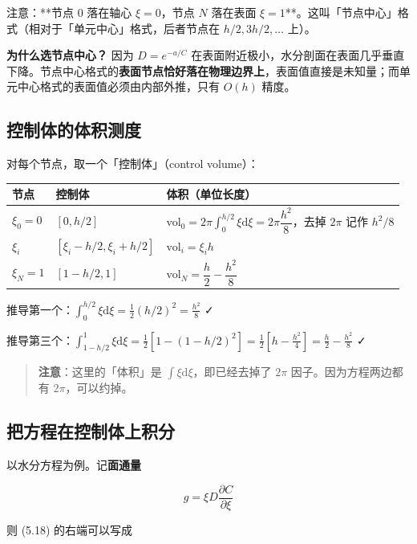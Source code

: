 注意：**节点 0 落在轴心 $\xi=0$，节点 $N$ 落在表面 $\xi=1$**。这叫「节点中心」格式（相对于「单元中心」格式，后者节点在 $h/2,3h/2,\dots$ 上）。


\textbf{为什么选节点中心？} 因为 $D=e^{-a/C}$ 在表面附近极小，水分剖面在表面几乎垂直下降。节点中心格式的\textbf{表面节点恰好落在物理边界上}，表面值直接是未知量；而单元中心格式的表面值必须由内部外推，只有 $O(h)$ 精度。


\subsection{控制体的体积测度}


对每个节点，取一个「控制体」（control volume）：


\begin{center}
\small
\begin{tabular}{lll}
\toprule
节点 & 控制体 & 体积（单位长度） \\
\midrule
$\xi_0=0$ & $[0,h/2]$ & $\mathrm{vol}_0=2\pi\int_0^{h/2}\xi\mathrm{d}\xi=2\pi\dfrac{h^2}{8}$，去掉 $2\pi$ 记作 $h^2/8$ \\
$\xi_i$ & $[\xi_i-h/2,\xi_i+h/2]$ & $\mathrm{vol}_i=\xi_i h$ \\
$\xi_N=1$ & $[1-h/2,1]$ & $\mathrm{vol}_N=\dfrac h2-\dfrac{h^2}{8}$ \\
\bottomrule
\end{tabular}
\end{center}


推导第一个：$\int_0^{h/2}\xi\mathrm{d}\xi=\frac12(h/2)^2=\frac{h^2}{8}$ ✓

推导第三个：$\int_{1-h/2}^{1}\xi\mathrm{d}\xi=\frac12\left[1-(1-h/2)^2\right]=\frac12\left[h-\frac{h^2}{4}\right]=\frac h2-\frac{h^2}8$ ✓


\begin{quote}
\textbf{注意}：这里的「体积」是 $\int\xi\mathrm{d}\xi$，即已经去掉了 $2\pi$ 因子。因为方程两边都有 $2\pi$，可以约掉。
\end{quote}


\subsection{把方程在控制体上积分}


以水分方程为例。记\textbf{面通量}


\begin{equation}
g=\xi D\frac{\partial C}{\partial\xi}\tag{7.2}
\end{equation}


则 (5.18) 的右端可以写成


